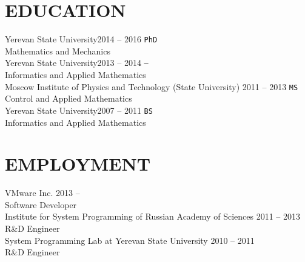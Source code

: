 \documentclass[10pt]{res}
\begin{document}
\begin{resume}


\section{EDUCATION}
\vspace{5pt}
	Yerevan State University\hfill 2014 -- 2016 \quad \texttt{PhD} \\
	Mathematics and Mechanics \vspace{5pt} \\
	Yerevan State University\hfill 2013 -- 2014  \quad \texttt{---} \\
	Informatics and Applied Mathematics \vspace{5pt} \\
	Moscow Institute of Physics and Technology (State University) \hfill 2011 -- 2013 \quad \texttt{MS}\\
	Control and Applied Mathematics \vspace{5pt} \\
	Yerevan State University\hfill 2007 -- 2011 \quad \texttt{BS}\\
	Informatics and Applied Mathematics

\section{EMPLOYMENT}
\vspace{5pt}
	VMware Inc. \hfill 2013 -- \latestjobyear \yearpostfix \\
	Software Developer \vspace{5pt} \\
	Institute for System Programming of Russian Academy of Sciences \hfill 2011 -- 2013 \yearpostfix \\%
	R\&D Engineer \vspace{5pt} \\
	System Programming Lab at Yerevan State University \hfill 2010 -- 2011 \yearpostfix \\
	R\&D Engineer


\end{resume}
\end{document}
